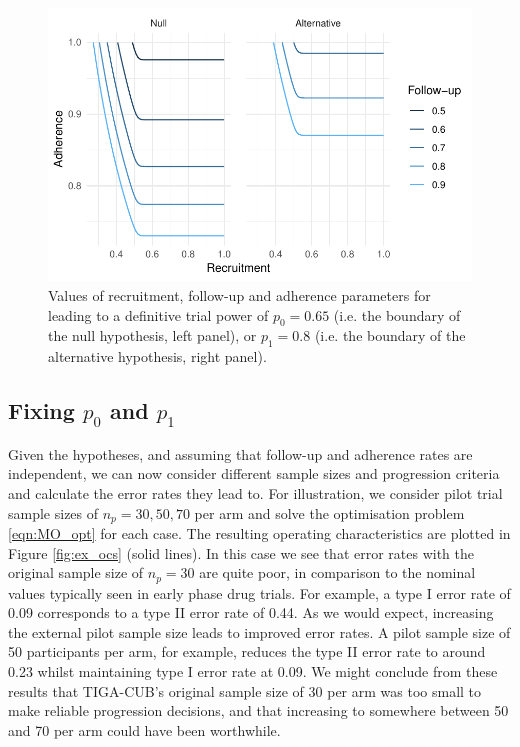 \documentclass[AMA,STIX1COL]{WileyNJD-v2}
\begin{document}
\begin{figure}
\centering
\includegraphics[scale=0.8]{./Figures/hyps.pdf}
\caption{Values of recruitment, follow-up and adherence parameters for leading to a definitive trial power of $p_0 = 0.65$ (i.e. the boundary of the null hypothesis, left panel), or $p_1 = 0.8$ (i.e. the boundary of the alternative hypothesis, right panel).}
\label{fig:hyps}
\end{figure}

\subsection{Fixing $p_0$ and $p_1$}

Given the hypotheses, and assuming that follow-up and adherence rates are independent, we can now consider different sample sizes and progression criteria and calculate the error rates they lead to. For illustration, we consider pilot trial sample sizes of $n_p = 30, 50, 70$ per arm and solve the optimisation problem \ref{eqn:MO_opt} for each case. The resulting operating characteristics are plotted in Figure \ref{fig:ex_ocs} (solid lines). In this case we see that error rates with the original sample size of $n_p = 30$ are quite poor, in comparison to the nominal values typically seen in early phase drug trials. For example, a type I error rate of 0.09 corresponds to a type II error rate of 0.44. As we would expect, increasing the external pilot sample size leads to improved error rates. A pilot sample size of 50 participants per arm, for example, reduces the type II error rate to around 0.23 whilst maintaining type I error rate at 0.09. We might conclude from these results that TIGA-CUB's original sample size of 30 per arm was too small to make reliable progression decisions, and that increasing to somewhere between 50 and 70 per arm could have been worthwhile.
\end{document}
